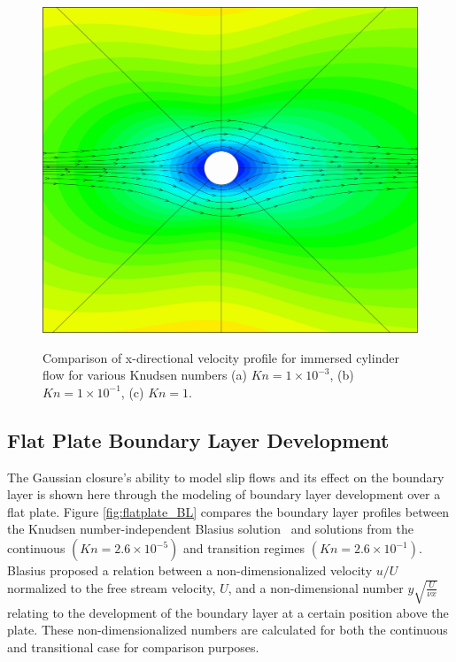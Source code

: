 \documentclass[titlepage,11pt,letterpaper]{article}
\begin{document}
\begin{figure}[t]
\begin{center}
{      \includegraphics[width=0.22\textheight]{./figs/freeexample.jpg}}
    \caption{Comparison of x-directional velocity profile for immersed cylinder flow for various Knudsen numbers
      (a) $Kn = 1 \times 10^{-3}$,  
      (b) $Kn = 1 \times 10^{-1}$,
      (c) $Kn = 1. $
    }
    \label{fig:cyl_x}
  \end{center}    
\end{figure}
%
\subsection{Flat Plate Boundary Layer Development}\label{sec:flatplate} 
The Gaussian closure's ability to model slip flows and its effect on the boundary layer is 
shown here through the modeling of boundary layer development over a flat plate. Figure 
\ref{fig:flatplate_BL} compares the boundary layer profiles between the Knudsen 
number-independent Blasius solution~\cite{granger:1995} and solutions from the continuous 
$(Kn=2.6\times 10^{-5})$ and transition regimes $(Kn=2.6\times 10^{-1})$. Blasius proposed a 
relation between a non-dimensionalized velocity $u/U$ normalized to the free stream 
velocity, $U$, and a non-dimensional number $y \sqrt{\frac{U}{\nu x}}$ relating to the 
development of the boundary layer at a certain position above the plate. These 
non-dimensionalized numbers are calculated for both the continuous and transitional case 
for comparison purposes.
\end{document}
